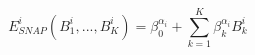 \documentclass[12pt]{article}
\begin{document}
$$
E^i_{SNAP}(B_1^i,...,B_K^i) = \beta^{\alpha_i}_0 + \sum_{k=1}^K \beta_k^{\alpha_i} B_k^i
$$
\end{document}
